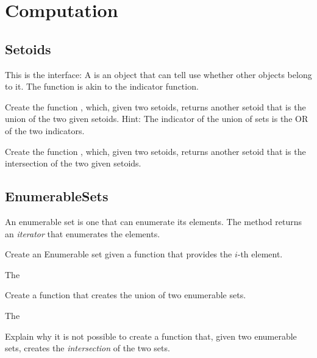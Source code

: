 
\chapter{Computation}


\section{Setoids}

This is the \Setoid interface:
%
%
A \Setoid is an object that can tell use whether other objects belong to it.
The  function is akin to the indicator function.


\begin{gradedexercise}
  Create the function , which, given two setoids, returns another setoid that is the union of the two given setoids.
%
%
  Hint: The indicator of the union of sets is the OR of the two indicators.
\end{gradedexercise}

\begin{gradedexercise}
  Create the function , which, given two setoids, returns another setoid that is the intersection of the two given setoids.
%
\end{gradedexercise}


\section{EnumerableSets}

%
An enumerable set is one that can enumerate its elements.
The method  returns an \emph{iterator} that enumerates the elements.

\begin{gradedexercise}
  Create an Enumerable set given a function that provides the $i$-th element.

  The
%
\end{gradedexercise}

\begin{gradedexercise}
  Create a function that creates the union of two enumerable sets.

  The
%
\end{gradedexercise}

\begin{gradedexercise}
  Explain why it is not possible to create a function that, given two enumerable sets,
  creates the \emph{intersection} of the two sets.
\end{gradedexercise}

